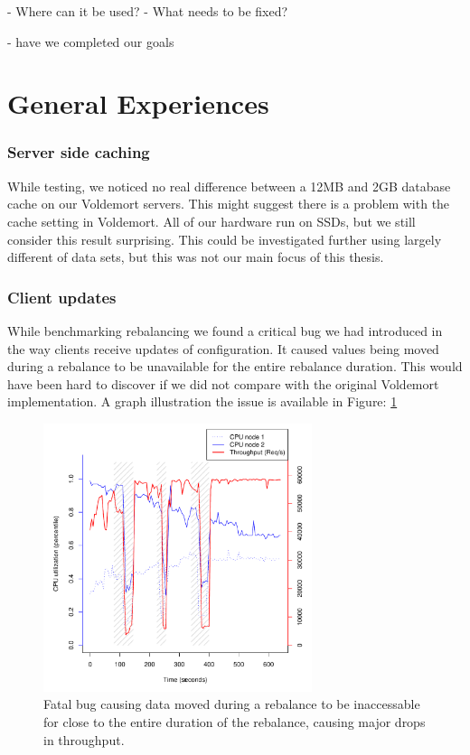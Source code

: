 - Where can it be used?
- What needs to be fixed?

- have we completed our goals



\section{General Experiences}

\subsubsection{Server side caching}
While testing, we noticed no real difference between a 12MB and 2GB database cache on our Voldemort servers. This might suggest there is a problem with the cache setting in Voldemort. All of our hardware run on SSDs, but we still consider this result surprising. This could be investigated further using largely different of data sets, but this was not our main focus of this thesis.

\subsubsection{Client updates}
While benchmarking rebalancing we found a critical bug we had introduced in the way clients receive updates of configuration. It caused values being moved during a rebalance to be unavailable for the entire rebalance duration. This would have been hard to discover if we did not compare with the original Voldemort implementation. A graph illustration the issue is available in Figure: \ref{fig:adaptive_bug}

\begin{figure}[h]
    \centering
    \includegraphics[width=0.7\textwidth]{results/throughput/adaptive/zookeeper/auto_2nodes_error}
    \caption{Fatal bug causing data moved during a rebalance to be inaccessable for close to the entire duration of the rebalance, causing major drops in throughput.}
    \label{fig:adaptive_bug}
\end{figure}

